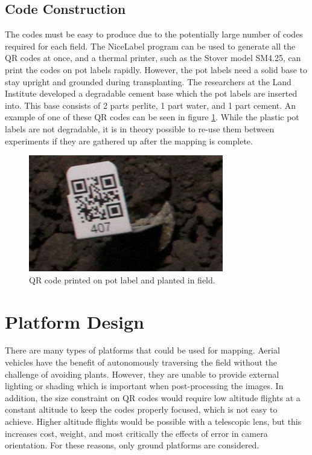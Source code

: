 \subsection{Code Construction}

The codes must be easy to produce due to the potentially large number of codes required for each field.  The NiceLabel program can be used to generate all the QR codes at once, and a thermal printer, such as the Stover model SM4.25, can print the codes on pot labels rapidly.  However, the pot labels need a solid base to stay upright and grounded during transplanting. The researchers at the Land Institute developed a degradable cement base which the pot labels are inserted into.  This base consists of 2 parts perlite, 1 part water, and 1 part cement.  An example of one of these QR codes can be seen in figure \ref{QR_code}.  While the plastic pot labels are not degradable, it is in theory possible to re-use them between experiments if they are gathered up after the mapping is complete.

\begin{figure}
	\centering
    \includegraphics[height=2in]{figures/qr_code_407.jpg}
    \caption[QR code]{QR code printed on pot label and planted in field.}
    \label{QR_code}
\end{figure}

\section{Platform Design}
\label{section:platform_design}

There are many types of platforms that could be used for mapping.  Aerial vehicles have the benefit of autonomously traversing the field without the challenge of avoiding plants. However, they are unable to provide external lighting or shading which is important when post-processing the images. In addition, the size constraint on QR codes would require low altitude flights at a constant altitude to keep the codes properly focused, which is not easy to achieve.  Higher altitude flights would be possible with a telescopic lens, but this increases cost, weight, and most critically the effects of error in camera orientation.  For these reasons, only ground platforms are considered.

